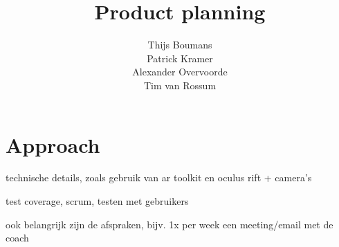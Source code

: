 \documentclass[11pt] {article}
\title{Product planning}
\author{Thijs Boumans\\ Patrick Kramer\\ Alexander Overvoorde\\ Tim van Rossum}
\date{}
\begin{document}
\maketitle



\section{Approach}

technische details, zoals gebruik van ar toolkit en oculus rift + camera's

test coverage, scrum, testen met gebruikers

ook belangrijk zijn de afspraken, bijv. 1x per week een meeting/email met de coach


\end{document}
